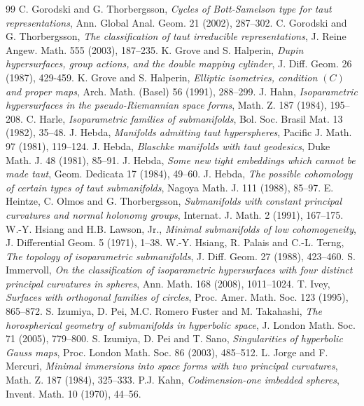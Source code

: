 \documentclass[12pt]{article}
\begin{document}
{\begin{thebibliography}{99}
 C. Gorodski and G. Thorbergsson, {\em Cycles of Bott-Samelson type for taut representations}, Ann. Global Anal. Geom. 21 (2002), 287--302.
 C. Gorodski and G. Thorbergsson, {\em The classification of taut irreducible representations}, J. Reine Angew. Math. 555 (2003), 187--235.
 K. Grove and S. Halperin, {\em Dupin
hypersurfaces, group actions, and the double mapping cylinder},
J. Diff. Geom. 26 (1987), 429-459.
 K. Grove and S. Halperin, {\em Elliptic isometries, condition $(C)$ and proper maps},
Arch. Math. (Basel)  56 (1991), 288--299.
 J. Hahn, {\em Isoparametric hypersurfaces
in the pseudo-Riemannian space forms}, Math. Z. 187
(1984), 195--208.
 C. Harle, {\em Isoparametric families of
submanifolds}, Bol. Soc. Brasil Mat. 13 (1982), 35--48.
 J. Hebda, {\em Manifolds admitting taut
hyperspheres}, Pacific J. Math. 97 (1981), 119--124.
 J. Hebda, {\em Blaschke manifolds with taut geodesics}, Duke Math. J. 48 (1981), 85--91.
 J. Hebda, {\em Some new
tight embeddings which cannot be made taut}, Geom. Dedicata
17 (1984), 49--60.
 J. Hebda, {\em The possible
cohomology of certain types of taut submanifolds}, Nagoya
Math. J. 111 (1988), 85--97.
 E. Heintze, C. Olmos and G. Thorbergsson,
{\em Submanifolds with constant principal curvatures and
normal holonomy groups},
Internat. J. Math. 2 (1991), 167--175.
W.-Y. Hsiang and H.B. Lawson, Jr.,
{\em Minimal submanifolds of low cohomogeneity}, 
J. Differential Geom.  5 (1971), 1--38.
W.-Y. Hsiang, R. Palais and C.-L. Terng,
{\em The topology of isoparametric submanifolds}, J. Diff. Geom. 27
(1988), 423--460.
 S. Immervoll, {\em On the classification of isoparametric hypersurfaces with four distinct principal
curvatures in spheres}, Ann. Math. 168 (2008), 1011--1024.
 T. Ivey,
{\em Surfaces with orthogonal families of circles}, Proc. Amer.
Math. Soc. 123 (1995), 865--872. 
 S. Izumiya, D. Pei, M.C. Romero Fuster and M. Takahashi, {\em The horospherical geometry of submanifolds in hyperbolic space}, J. London Math. Soc. 71 (2005), 779--800.
 S. Izumiya, D. Pei and T. Sano, {\em Singularities of hyperbolic Gauss maps}, Proc. London Math. Soc. 86 (2003), 485--512.
 L. Jorge and F. Mercuri, {\em Minimal immersions
into space forms with two principal curvatures}, Math. Z. 187
(1984), 325--333.
 P.J. Kahn, {\em Codimension-one imbedded spheres}, Invent. Math. 10 (1970), 44--56.

\end{thebibliography}}
\end{document}
